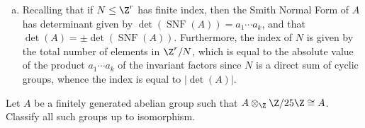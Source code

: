 \documentclass[10pt]{mypackage}
\begin{document}
\begin{solution}
\begin{enumerate}[(a)]
      Meanwhile, if $N$ has infinite index in $\Z^{r}$, then we have
      \begin{align*}
        \Z^{r}/N &= \Z^{r-k} \oplus \left( \bigoplus_{i=1}^{k}\Z/\left( a_i \right) \right),
      \end{align*}
      with $r > k$. In particular, this means that there are $k < r$ invariant factors $a_1,\dots,a_k$, and the Smith Normal form of $A$ is given by $\operatorname{diag}\left( a_1,\dots,a_k,0,\dots,0 \right)$. In particular, this means that $\det\left( A \right) = 0$.
    \item Recalling that if $N\leq \Z^{r}$ has finite index, then the Smith Normal Form of $A$ has determinant given by $\det\left( \operatorname{SNF}\left( A \right) \right) = a_1\cdots a_k$, and that $\det\left( A \right) = \pm \det\left( \operatorname{SNF}\left( A \right) \right)$. Furthermore, the index of $N$ is given by the total number of elements in $\Z^{r}/N$, which is equal to the absolute value of the product $a_1\cdots a_k$ of the invariant factors since $N$ is a direct sum of cyclic groups, whence the index is equal to $\left\vert \det\left( A \right) \right\vert$.
  \end{enumerate}
\end{solution}
\begin{problem}[Problem 6]
  Let $A$ be a finitely generated abelian group such that $A\otimes_{\Z}\Z/25\Z\cong A$. Classify all such groups up to isomorphism.
\end{problem}
\end{document}

